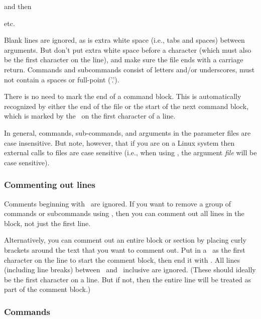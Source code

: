 and then
\begin{description}
\item {}
\item {}
\item etc.
\end{description}

Blank lines are ignored, as is extra white space (i.e., tabs and spaces) between arguments. But don't put extra white space before a \command{} character (which must also be the first character on the line), and make sure the file ends with a carriage return. Commands and subcommands consist of letters and/or underscores, must not contain a spaces or full-point ('.').

There is no need to mark the end of a command block. This is automatically recognized by either the end of the file or the start of the next command block, which is marked by the \command{}\ on the first character of a line.

In general, commands, sub-commands, and arguments in the parameter files are case insensitive. But note, however, that if you are on a Linux system then external calls to files are case sensitive (i.e., when using , the argument \emph{file} will be case sensitive). 

\subsubsection{Commenting out lines}

Comments beginning with \commentline\ are ignored. If you want to remove a group of commands or subcommands using \commentline, then you can comment out all lines in the block, not just the first line. 

Alternatively, you can comment out an entire block or section by placing curly brackets around the text that you want to comment out. Put in a \commentstart\ as the first character on the line to start the comment block, then end it with \commentend. All lines (including line breaks) between \commentstart\ and \commentend\ inclusive are ignored. (These should ideally be the first character on a line. But if not, then the entire line will be treated as part of the comment block.)

\subsubsection{Commands}

